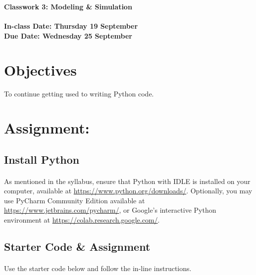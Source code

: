 \documentclass[letter,10pt]{article}
\begin{document}
    \huge
    \textbf{Classwork 3: Modeling \& Simulation}
    \normalsize
    \\ ~~ \\
    \textbf{In-class Date: Thursday 19 September} \\
    \textbf{Due Date: Wednesday 25 September}
    
    \section*{Objectives}
    \paragraph{}To continue getting used to writing Python code.
    
    \section*{Assignment:}
    \subsection{Install Python}
    \paragraph{}As mentioned in the syllabus, ensure that Python with IDLE is installed on your computer, available at \url{https://www.python.org/downloads/}. Optionally, you may use PyCharm Community Edition available at \url{https://www.jetbrains.com/pycharm/}, or Google's interactive Python environment at \url{https://colab.research.google.com/}.
    
    \subsection*{Starter Code \& Assignment}
    \paragraph{}Use the starter code below and follow the in-line instructions.
    
\end{document}
